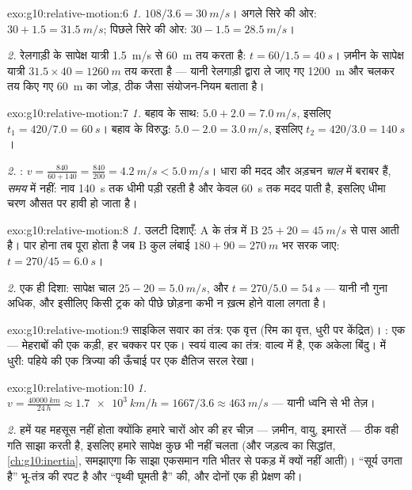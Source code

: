 \begin{solution}{exo:g10:relative-motion:6}
\emph{1.} $108/3.6 = \qty{30}{m/s}$। अगले सिरे की ओर: $30 + 1.5 = \qty{31.5}{m/s}$; पिछले सिरे की ओर: $30 - 1.5 = \qty{28.5}{m/s}$।

\emph{2.} रेलगाड़ी के सापेक्ष यात्री \qty{1.5}{m/s} से \qty{60}{m} तय करता है:
$t = 60/1.5 = \qty{40}{s}$। ज़मीन के सापेक्ष यात्री $31.5 \times 40 = \qty{1260}{m}$ तय करता है --- यानी रेलगाड़ी
द्वारा ले जाए गए \qty{1200}{m} और चलकर तय किए गए \qty{60}{m} का जोड़, ठीक जैसा
संयोजन-नियम बताता है।
\end{solution}

\begin{solution}{exo:g10:relative-motion:7}
\emph{1.} बहाव के साथ: $5.0 + 2.0 = \qty{7.0}{m/s}$, इसलिए $t_1 = 420/7.0 = \qty{60}{s}$। बहाव के विरुद्ध: $5.0 - 2.0 = \qty{3.0}{m/s}$,
इसलिए $t_2 = 420/3.0 = \qty{140}{s}$।

\emph{2.} : $v = \frac{840}{60 + 140}
= \frac{840}{200} = \qty{4.2}{m/s} < \qty{5.0}{m/s}$। धारा की मदद और अड़चन \emph{चाल} में
बराबर हैं, \emph{समय} में नहीं: नाव \qty{140}{s} तक धीमी पड़ी रहती है और केवल
\qty{60}{s} तक मदद पाती है, इसलिए धीमा चरण औसत पर हावी हो जाता है।
\end{solution}

\begin{solution}{exo:g10:relative-motion:8}
\emph{1.} उलटी दिशाएँ: A के तंत्र में B $25 + 20 = \qty{45}{m/s}$ से पास आती है। पार होना
तब पूरा होता है जब B कुल लंबाई $180 + 90 = \qty{270}{m}$ भर सरक जाए: $t = 270/45 = \qty{6.0}{s}$।

\emph{2.} एक ही दिशा: सापेक्ष चाल $25 - 20 = \qty{5.0}{m/s}$, और $t = 270/5.0 = \qty{54}{s}$ --- यानी नौ गुना
अधिक, और इसीलिए किसी ट्रक को पीछे छोड़ना कभी न ख़त्म होने वाला लगता है।
\end{solution}

\begin{solution}{exo:g10:relative-motion:9}
साइकिल सवार का तंत्र: एक वृत्त (रिम का वृत्त, धुरी पर केंद्रित)।
: एक  --- मेहराबों की एक कड़ी, हर
चक्कर पर एक। स्वयं वाल्व का तंत्र: वाल्व  में है, एक अकेला
बिंदु।  में धुरी: पहिये की एक त्रिज्या की ऊँचाई
पर एक क्षैतिज सरल रेखा।
\end{solution}

\begin{solution}{exo:g10:relative-motion:10}
\emph{1.} $v = \frac{\qty{40000}{km}}{\qty{24}{h}}
\approx \qty{1.7e3}{km/h} = 1667/3.6 \approx \qty{463}{m/s}$ --- यानी ध्वनि से भी तेज़।

\emph{2.} हमें यह महसूस नहीं होता क्योंकि हमारे चारों ओर की हर चीज़ ---
ज़मीन, वायु, इमारतें --- ठीक वही गति साझा करती है, इसलिए हमारे सापेक्ष
कुछ भी नहीं चलता (और जड़त्व का सिद्धांत, \cref{ch:g10:inertia}, समझाएगा कि साझा एकसमान
गति भीतर से पकड़ में क्यों नहीं आती)। ``सूर्य उगता है'' भू-तंत्र की रपट
है और ``पृथ्वी घूमती है''  की, और दोनों एक ही प्रेक्षण
की।
\end{solution}

